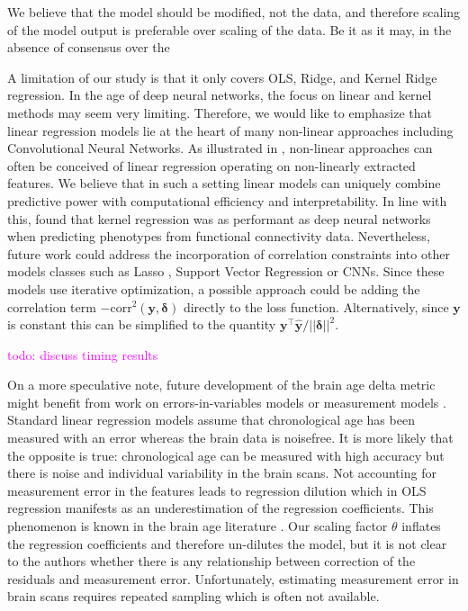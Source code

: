 \documentclass[utf8]{frontiersSCNS} %
\newcommand{\todo}[1]{\textcolor{Magenta}{todo: #1}}
\renewcommand{\a}{\theta}
\newcommand{\corr}{\text{corr}}
\renewcommand{\d}{\boldsymbol{\delta}}
\newcommand{\y}{\mathbf{y}}
\newcommand{\yh}{\mathbf{\hat{y}}}
\begin{document}
We believe that the model should be modified, not the data, and therefore scaling of the model output is preferable over scaling of the data. Be it as it may, in the absence of consensus over the 

A limitation of our study is that it only covers OLS, Ridge, and Kernel Ridge regression. In the age of deep neural networks, the focus on linear and kernel methods may seem very limiting.  Therefore, we would like to emphasize that linear regression models lie at the heart of many non-linear approaches including Convolutional Neural Networks. As illustrated in , non-linear approaches can often be conceived of linear regression operating on non-linearly extracted features. We believe that in such a setting linear models can uniquely combine predictive power with computational efficiency and interpretability. In line with this, \cite{He2020DeepDemographics} found that kernel regression was as performant as deep neural networks when predicting phenotypes from functional connectivity data. Nevertheless, future work could address the incorporation of correlation constraints into other models classes such as Lasso \citep{Tibshirani2011RegressionRetrospective}, Support Vector Regression \citep{Muller1997} or CNNs. Since these models use iterative optimization, a possible approach could be adding the correlation term $-\corr^2(\y,\d)$ directly to the loss function. Alternatively, since $\y$ is constant this can be simplified to the quantity $\y^\top\yh / ||\d||^2$.

\todo{discuss timing results}

On a more speculative note, future development of the brain age delta metric might benefit from work on errors-in-variables models \citep{Frost2000CorrectingJSTOR,Berglund2012RegressionCalculation,Gleser1981EstimationResults} or measurement models \citep{Fuller1987MeasurementModels}. Standard linear regression models assume that chronological age has been measured with an error whereas the brain data is noisefree. It is more likely that the opposite is true: chronological age can be measured with high accuracy but there is noise and individual variability in the brain scans. Not accounting for measurement error in the features leads to regression dilution which in OLS regression manifests as an underestimation of the regression coefficients. This phenomenon is known in the brain age literature \citep{Smith2019EstimationImaging,Le2018ABrainAGE}. Our scaling factor $\a$ inflates the regression coefficients and therefore un-dilutes the model, but it is not clear to the authors whether there is any relationship between correction of the residuals and measurement error. Unfortunately, estimating measurement error in brain scans requires repeated sampling which is often not available. 
\end{document}
